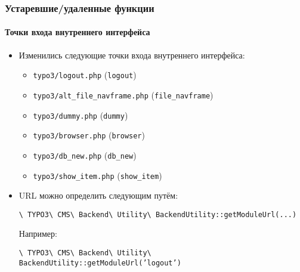 \begin{frame}[fragile]
	\frametitle{Устаревшие/удаленные функции}
	\framesubtitle{Точки входа внутреннего интерфейса}

	\begin{itemize}

		\item Изменились следующие точки входа внутреннего интерфейса:

			\begin{itemize}
				\item \texttt{typo3/logout.php}					\tabto{6cm}(\begingroup\color{typo3orange}\texttt{logout}\endgroup)
				\item \texttt{typo3/alt\_file\_navframe.php}	\tabto{6cm}(\begingroup\color{typo3orange}\texttt{file\_navframe}\endgroup)
				\item \texttt{typo3/dummy.php}					\tabto{6cm}(\begingroup\color{typo3orange}\texttt{dummy}\endgroup)
				\item \texttt{typo3/browser.php}				\tabto{6cm}(\begingroup\color{typo3orange}\texttt{browser}\endgroup)
				\item \texttt{typo3/db\_new.php}				\tabto{6cm}(\begingroup\color{typo3orange}\texttt{db\_new}\endgroup)
				\item \texttt{typo3/show\_item.php}				\tabto{6cm}(\begingroup\color{typo3orange}\texttt{show\_item}\endgroup)
			\end{itemize}

		\item URL можно определить следующим путём:

			\smaller
				\texttt{\textbackslash
					TYPO3\textbackslash
					CMS\textbackslash
					Backend\textbackslash
					Utility\textbackslash
					BackendUtility::getModuleUrl(...)}
			\normalsize

			Например:

			\smaller
				\texttt{\textbackslash
					TYPO3\textbackslash
					CMS\textbackslash
					Backend\textbackslash
					Utility\textbackslash
					BackendUtility::getModuleUrl('}\begingroup\color{typo3orange}\texttt{logout}\endgroup\texttt{')}
			\normalsize

	\end{itemize}

\end{frame}


